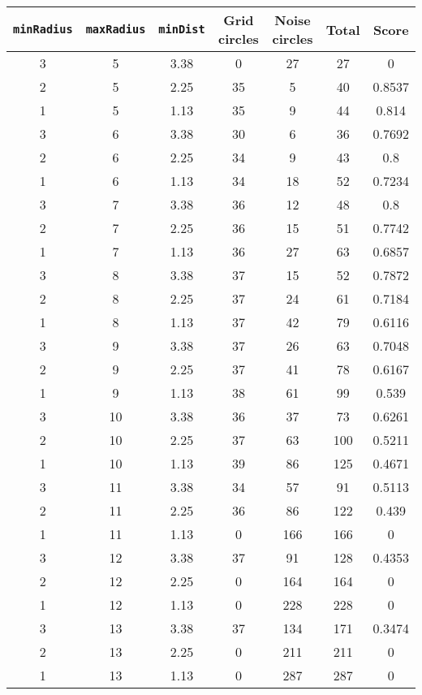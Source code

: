 \documentclass[letterpaper, 12pt]{article}
\begin{document}
\begin{longtable}{|c|c|c|c|c|c|c|}
\hline
\textbf{\texttt{minRadius}} & \textbf{\texttt{maxRadius}} & \textbf{\texttt{minDist}} & \textbf{Grid circles} & \textbf{Noise circles} & \textbf{Total} & \textbf{Score} \\
\hline
3 & 5 & 3.38 & 0 & 27 & 27 & 0 \\
\hline
2 & 5 & 2.25 & 35 & 5 & 40 & 0.8537 \\
\hline
1 & 5 & 1.13 & 35 & 9 & 44 & 0.814 \\
\hline
3 & 6 & 3.38 & 30 & 6 & 36 & 0.7692 \\
\hline
2 & 6 & 2.25 & 34 & 9 & 43 & 0.8 \\
\hline
1 & 6 & 1.13 & 34 & 18 & 52 & 0.7234 \\
\hline
3 & 7 & 3.38 & 36 & 12 & 48 & 0.8 \\
\hline
2 & 7 & 2.25 & 36 & 15 & 51 & 0.7742 \\
\hline
1 & 7 & 1.13 & 36 & 27 & 63 & 0.6857 \\
\hline
3 & 8 & 3.38 & 37 & 15 & 52 & 0.7872 \\
\hline
2 & 8 & 2.25 & 37 & 24 & 61 & 0.7184 \\
\hline
1 & 8 & 1.13 & 37 & 42 & 79 & 0.6116 \\
\hline
3 & 9 & 3.38 & 37 & 26 & 63 & 0.7048 \\
\hline
2 & 9 & 2.25 & 37 & 41 & 78 & 0.6167 \\
\hline
1 & 9 & 1.13 & 38 & 61 & 99 & 0.539 \\
\hline
3 & 10 & 3.38 & 36 & 37 & 73 & 0.6261 \\
\hline
2 & 10 & 2.25 & 37 & 63 & 100 & 0.5211 \\
\hline
1 & 10 & 1.13 & 39 & 86 & 125 & 0.4671 \\
\hline
3 & 11 & 3.38 & 34 & 57 & 91 & 0.5113 \\
\hline
2 & 11 & 2.25 & 36 & 86 & 122 & 0.439 \\
\hline
1 & 11 & 1.13 & 0 & 166 & 166 & 0 \\
\hline
3 & 12 & 3.38 & 37 & 91 & 128 & 0.4353 \\
\hline
2 & 12 & 2.25 & 0 & 164 & 164 & 0 \\
\hline
1 & 12 & 1.13 & 0 & 228 & 228 & 0 \\
\hline
3 & 13 & 3.38 & 37 & 134 & 171 & 0.3474 \\
\hline
2 & 13 & 2.25 & 0 & 211 & 211 & 0 \\
\hline
1 & 13 & 1.13 & 0 & 287 & 287 & 0 \\

\end{longtable}
\end{document}
